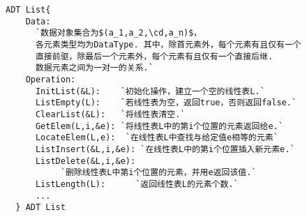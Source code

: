 \begin{lstlisting}[mathescape=true,frame=tb]
  ADT List{
    Data:
      `数据对象集合为$(a_1,a_2,\cd,a_n)$，
      各元素类型均为DataType. 其中，除首元素外，每个元素有且仅有一个
      直接前驱，除最后一个元素外，每个元素有且仅有一个直接后继. 
      数据元素之间为一对一的关系.`
    Operation:
      InitList(&L):    `初始化操作，建立一个空的线性表L.`
      ListEmpty(L):    `若线性表为空，返回true，否则返回false.`
      ClearList(&L):   `将线性表清空.`
      GetElem(L,i,&e): `将线性表L中的第i个位置的元素返回给e.`
      LocateElem(L,e):  `在线性表L中查找与给定值e相等的元素`
      ListInsert(&L,i,&e): `在线性表L中的第i个位置插入新元素e.`
      ListDelete(&L,i,&e):  
           `删除线性表L中第i个位置的元素，并用e返回该值.`
      ListLength(L):      `返回线性表L的元素个数.`      
      ...
  } ADT List
\end{lstlisting}
